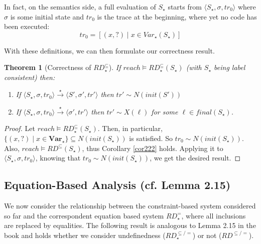 \documentclass[a4wide,12pt]{article}
\theoremstyle{definition}
\theoremstyle{plain}
\newtheorem{theo}{Theorem}
\theoremstyle{remark}
\def\const#1{\mathopen{\langle}#1\mathclose{\rangle}} %
\def\pair#1{\const{#1}}
\def\Var {\mathbf{Var}}
\def\starto{\overset{\star}{\to}}
\begin{document}
In fact, on the semantics side, a full evaluation of $S_\star$ starts from $\pair{S_\star,\sigma,tr_0}$
where $\sigma$ is some initial state and $tr_0$ is the trace at the beginning, where yet no code
has been executed:
\[tr_0 = [ (x,?) \mid x \in Var_\star(S_\star) ] \]

With these definitions, we can then formulate our correctness result.
\begin{theo}[Correctness of $RD^\subseteq_\star$]
If $reach \models RD_\star^\subseteq(S_\star)$ (with $S_\star$ being label consistent) then:

\begin{enumerate}
\item If $\pair{S_\star, \sigma, tr_0} \starto \pair{S', \sigma', tr'}$ then $ tr' \sim
N(init(S'))$ 
\item If $\pair{S_\star, \sigma, tr_0} \starto \pair{\sigma', tr'}$ then $ tr' \sim
X(\ell)$ for some $\ell \in final(S_\star)$.
\end{enumerate}
\end{theo}
\begin{proof}
Let $reach \models RD_\star^\subseteq(S_\star)$. Then, in particular,
$\{(x,?) \mid x \in \Var_\star\} \subseteq N(init(S_\star))$  is satisfied. So
$tr_0 \sim N(init(S_\star))$. Also,
$reach \models RD^\subseteq(S_\star)$, thus Corollary \ref{cor222} holds. Applying it
to $\pair{S_\star,\sigma,tr_0}$, knowing that $tr_0 \sim N(init(S_\star))$,
we get the desired result.
\end{proof}

 
\subsection*{Equation-Based Analysis (cf. Lemma 2.15)}

We now consider the relationship between the constraint-based system considered so far and 
the correspondent equation based system $RD^=_\star$, where all inclusions are replaced by equalities.
The following result is analogous to Lemma 2.15 in the book and holds whether we consider undefinedness
($RD^{\subseteq/=}_\star$) or not ($RD^{\subseteq/=}$). 
\end{document}
